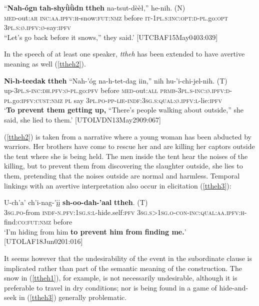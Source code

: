 \documentclass[output=paper,colorlinks,citecolor=brown
]{langscibook}
\begin{document}
\ea
\label{ttheh1}
\gll ``\textbf{Nah-ógn} \textbf{tah-shyǜǜdn} \textbf{ttheh} na-tsut-dèèł,'' {he-nih. \textnormal{(N)}} \\
\textsc{med}-out:\textsc{ar} \textsc{inc:aa.ipfv:h}-snow:\textsc{fut:nmz} before \textsc{it-1pl.s:inc:opt:d-pl}.go:\textsc{opt} \textsc{3pl.s:ø.ipfv:ø}-say:\textsc{ipfv} \\
``Let's go back before it snows,'' they said.' \hfill [UTCBAF15May0403:039]
\z

\noindent In the speech of at least one speaker, \textit{ttheh} has been extended to have avertive meaning as well (\ref{ttheh2}).

\ea
\label{ttheh2}
\gll \textbf{Ni-h-teedak} \textbf{ttheh} ``Nah-'óg na-h-tet-dag iin,'' nih {hu-'i-chi-jel-nih. \textnormal{(T)}} \\
up-\textsc{3pl.s-inc:dh.pfv:ø-pl}.go:\textsc{pfv} before \textsc{med}-out:\textsc{all} \textsc{prmb-3pl.s-inc:ø.ipfv:d-pl}.go:\textsc{ipfv:cust:nmz} \textsc{pl} say \textsc{3pl.po-pp-lie-indf:3sg.s:qual:ø.ipfv:l}-lie:\textsc{ipfv} \\
\glt `\textbf{To prevent them getting up,} ``There's people walking about outside,'' she said, she lied to them.' \hfill [UTOLVDN13May2909:067]
\z

\noindent (\ref{ttheh2}) is taken from a narrative where a young woman has been abducted by warriors. Her brothers have come to rescue her and are killing her captors outside the tent where she is being held. The men inside the tent hear the noises of the killing, but to prevent them from discovering the slaughter outside, she lies to them, pretending that the noises outside are normal and harmless. Temporal linkings with an avertive interpretation also occur in elicitation (\ref{ttheh3}):

\ea
\label{ttheh3}
\gll U-ch'a' ch'i-nag-'įį \textbf{sh-oo-dah-'aal} \textbf{ttheh}. \textnormal{(T)} \\
\textsc{3sg.po}-from \textsc{indf-n.pfv:1sg.s:l}-hide.self:\textsc{pfv} \textsc{3sg.s>1sg.o-con-inc:qual:aa.ipfv:h}-find:\textsc{co:fut:nmz} before \\
\glt `I'm hiding from him \textbf{to prevent him from finding me.}' \\ \hfill [UTOLAF18Jun0201:016]
\z 

It seems however that the undesirability of the event in the subordinate clause is implicated rather than part of the semantic meaning of the construction. The snow in (\ref{ttheh1}), for example, is not necessarily undesirable, although it is preferable to travel in dry conditions; nor is being found in a game of hide-and-seek in (\ref{ttheh3}) generally problematic. 
\end{document}
